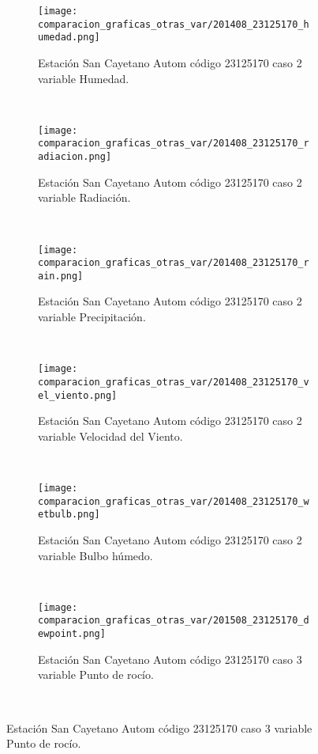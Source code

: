 \begin{figure}[H]
\centering
\begin{subfigure}[normla]{0.4\textwidth}
\caption{Estación San Cayetano Autom  código 23125170 caso 2 variable Humedad.}
\texttt{[image: comparacion\_graficas\_otras\_var/201408\_23125170\_humedad.png]}
\end{subfigure}
~
\begin{subfigure}[normla]{0.4\textwidth}
\caption{Estación San Cayetano Autom  código 23125170 caso 2 variable Radiación.}
\texttt{[image: comparacion\_graficas\_otras\_var/201408\_23125170\_radiacion.png]}
\end{subfigure}
~
\begin{subfigure}[normla]{0.4\textwidth}
\caption{Estación San Cayetano Autom  código 23125170 caso 2 variable Precipitación.}
\texttt{[image: comparacion\_graficas\_otras\_var/201408\_23125170\_rain.png]}
\end{subfigure}
~
\begin{subfigure}[normla]{0.4\textwidth}
\caption{Estación San Cayetano Autom  código 23125170 caso 2 variable Velocidad del Viento.}
\texttt{[image: comparacion\_graficas\_otras\_var/201408\_23125170\_vel\_viento.png]}
\end{subfigure}
~
\begin{subfigure}[normla]{0.4\textwidth}
\caption{Estación San Cayetano Autom  código 23125170 caso 2 variable Bulbo húmedo.}
\texttt{[image: comparacion\_graficas\_otras\_var/201408\_23125170\_wetbulb.png]}
\end{subfigure}
~
\begin{subfigure}[normla]{0.4\textwidth}
\caption{Estación San Cayetano Autom  código 23125170 caso 3 variable Punto de rocío.}
\texttt{[image: comparacion\_graficas\_otras\_var/201508\_23125170\_dewpoint.png]}
\end{subfigure}
~
\end{figure}
           

